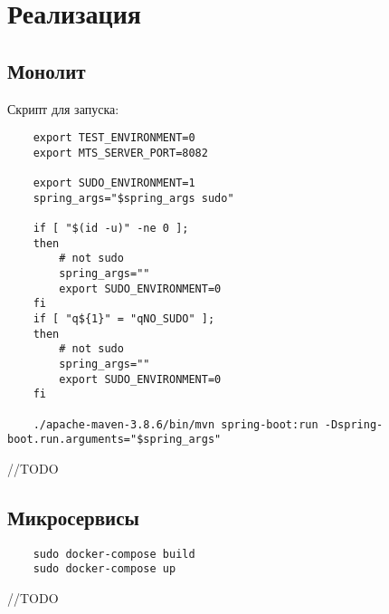 \section{Реализация}

\subsection{Монолит}
    Скрипт для запуска:
    \begin{lstlisting}
    export TEST_ENVIRONMENT=0
    export MTS_SERVER_PORT=8082
    
    export SUDO_ENVIRONMENT=1
    spring_args="$spring_args sudo"
    
    if [ "$(id -u)" -ne 0 ];
    then
        # not sudo
        spring_args=""
        export SUDO_ENVIRONMENT=0
    fi
    if [ "q${1}" = "qNO_SUDO" ];
    then
        # not sudo
        spring_args=""
        export SUDO_ENVIRONMENT=0
    fi
    
    ./apache-maven-3.8.6/bin/mvn spring-boot:run -Dspring-boot.run.arguments="$spring_args"
    \end{lstlisting}
    //TODO

\subsection{Микросервисы}
    \begin{lstlisting}
    sudo docker-compose build
    sudo docker-compose up
    \end{lstlisting}
    //TODO
    
        
\clearpage